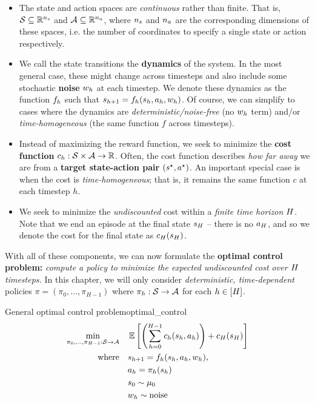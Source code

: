 \documentclass[\main/main]{subfiles}
\begin{document}
\begin{itemize}
    \item The state and action spaces are \emph{continuous} rather than finite. That is, $\mathcal{S} \subseteq \mathbb{R}^{n_s}$ and $\mathcal{A} \subseteq \mathbb{R}^{n_a}$, where $n_s$ and $n_a$ are the corresponding dimensions of these spaces, i.e. the number of coordinates to specify a single state or action respectively.
    \item We call the state transitions the \textbf{dynamics} of the system. In the most general case, these might change across timesteps and also include some stochastic \textbf{noise} $w_h$ at each timestep. We denote these dynamics as the function $f_h$ such that $s_{h+1} = f_h(s_h, a_h, w_h)$. Of course, we can simplify to cases where the dynamics are \emph{deterministic/noise-free} (no $w_h$ term) and/or \emph{time-homogeneous} (the same function $f$ across timesteps).
    \item Instead of maximizing the reward function, we seek to minimize the \textbf{cost function} $c_h: \mathcal{S} \times \mathcal{A} \to \mathbb{R}$. Often, the cost function describes \emph{how far away} we are from a \textbf{target state-action pair} $(s^\star, a^\star)$. An important special case is when the cost is \emph{time-homogeneous}; that is, it remains the same function $c$ at each timestep $h$.
    \item We seek to minimize the \emph{undiscounted} cost within a \emph{finite time horizon} $H$. Note that we end an episode at the final state $s_H$ -- there is no $a_H$, and so we denote the cost for the final state as $c_H(s_H)$.
\end{itemize}

With all of these components, we can now formulate the \textbf{optimal control problem:} \emph{compute a policy to minimize the expected undiscounted cost over $H$ timesteps.} In this chapter, we will only consider \emph{deterministic, time-dependent} policies $\pi = (\pi_0, \dots, \pi_{H-1})$ where $\pi_h : \mathcal{S} \to \mathcal{A}$ for each $h \in [H]$.

\begin{definition}{General optimal control problem}{optimal_control}
    \begin{equation}
        \begin{split}
            \min_{\pi_0, \dots, \pi_{H-1} : \mathcal{S} \to \mathcal{A}} \quad & \operatorname*{\mathbb{E}} \left[
                \left( \sum_{h=0}^{H-1} c_h(s_h, a_h) \right) + c_H(s_H)
                \right] \\
            \text{where} \quad & s_{h+1} = f_h(s_h, a_h, w_h), \\
            & a_h = \pi_h(s_h) \\
            & s_0 \sim \mu_0 \\
            & w_h \sim \text{noise}
        \end{split}
    \end{equation}
\end{definition}
\end{document}
